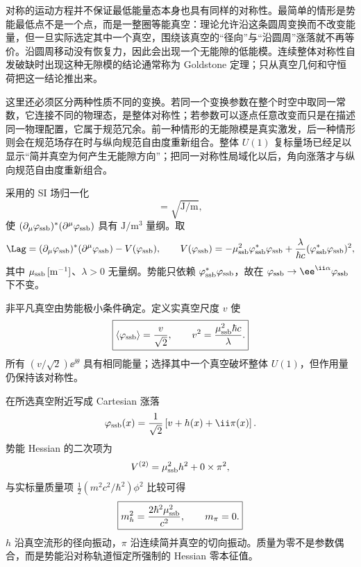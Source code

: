 对称的运动方程并不保证最低能量态本身也具有同样的对称性。最简单的情形是势能最低点不是一个点，而是一整圈等能真空：理论允许沿这条圆周变换而不改变能量，但一旦实际选定其中一个真空，围绕该真空的“径向”与“沿圆周”涨落就不再等价。沿圆周移动没有恢复力，因此会出现一个无能隙的低能模。连续整体对称性自发破缺时出现这种无隙模的结论通常称为 Goldstone 定理；只从真空几何和守恒荷把这一结论推出来。

这里还必须区分两种性质不同的变换。若同一个变换参数在整个时空中取同一常数，它连接不同的物理态，是整体对称性；若参数可以逐点任意改变而只是在描述同一物理配置，它属于规范冗余。前一种情形的无能隙模是真实激发，后一种情形则会在规范场存在时与纵向规范自由度重新组合。整体 \(U(1)\) 复标量场已经足以显示“简并真空为何产生无能隙方向”；把同一对称性局域化以后，角向涨落才与纵向规范自由度重新组合。

采用的 SI 场归一化
\begin{equation*}
 [\varphi_{\rm ssb}]=\sqrt{\mathrm{J/m}},
\end{equation*}
使 \((\partial_\mu\varphi_{\rm ssb})^*(\partial^\mu\varphi_{\rm ssb})\) 具有 \(\mathrm{J/m^3}\) 量纲。取
\begin{equation}
 \Lag
 =(\partial_\mu\varphi_{\rm ssb})^*(\partial^\mu\varphi_{\rm ssb})-V(\varphi_{\rm ssb}),
 \qquad
 V(\varphi_{\rm ssb})
 =-\mu_{\rm ssb}^2\varphi_{\rm ssb}^*\varphi_{\rm ssb}
 +\frac{\lambda}{\hbar c}(\varphi_{\rm ssb}^*\varphi_{\rm ssb})^2,
 \label{eq:ssb-complex-scalar-lag-dp11}
\end{equation}
其中 \(\mu_{\rm ssb}\,[\mathrm{m^{-1}}]\)、\(\lambda>0\) 无量纲。势能只依赖 \(\varphi_{\rm ssb}^*\varphi_{\rm ssb}\)，故在 \(\varphi_{\rm ssb}\to \ee^{\ii\alpha}\varphi_{\rm ssb}\) 下不变。

非平凡真空由势能极小条件确定。定义实真空尺度 \(v\) 使
\begin{equation}
 \boxed{
 \langle\varphi_{\rm ssb}\rangle=\frac{v}{\sqrt2},
 \qquad
 v^2=\frac{\mu_{\rm ssb}^2\hbar c}{\lambda}.}
 \label{eq:ssb-vev-general-dp11}
\end{equation}
所有 \((v/\sqrt2)\ee^{\ii\theta}\) 具有相同能量；选择其中一个真空破坏整体 \(U(1)\)，但作用量仍保持该对称性。

在所选真空附近写成 Cartesian 涨落
\begin{equation}
 \varphi_{\rm ssb}(x)=\frac1{\sqrt2}\left[v+h(x)+\ii\pi(x)\right].
 \label{eq:ssb-cartesian-fields-dp11}
\end{equation}
势能 Hessian 的二次项为
\begin{equation}
 V^{(2)}=\mu_{\rm ssb}^2h^2+0\times\pi^2,
 \label{eq:ssb-quadratic-potential-dp11}
\end{equation}
与实标量质量项 \(\tfrac12(m^2c^2/\hbar^2)\phi^2\) 比较可得
\begin{equation}
 \boxed{
 m_h^2=\frac{2\hbar^2\mu_{\rm ssb}^2}{c^2},
 \qquad
 m_\pi=0.}
 \label{eq:ssb-higgs-goldstone-masses-dp11}
\end{equation}
\(h\) 沿真空流形的径向振动，\(\pi\) 沿连续简并真空的切向振动。质量为零不是参数偶合，而是势能沿对称轨道恒定所强制的 Hessian 零本征值。

